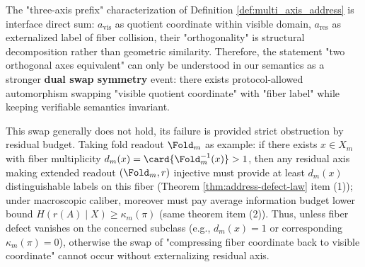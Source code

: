 \begin{remark}\label{rem:xi-dual-swap-symmetry-defect}
The "three-axis prefix" characterization of Definition \ref{def:multi_axis_address} is interface direct sum: \(a_{\mathrm{vis}}\) as quotient coordinate within visible domain, \(a_{\mathrm{res}}\) as externalized label of fiber collision, their "orthogonality" is structural decomposition rather than geometric similarity.
Therefore, the statement "two orthogonal axes equivalent" can only be understood in our semantics as a stronger \textbf{dual swap symmetry} event: there exists protocol-allowed automorphism swapping "visible quotient coordinate" with "fiber label" while keeping verifiable semantics invariant.
\par
This swap generally does not hold, its failure is provided strict obstruction by residual budget.
Taking fold readout \(\Fold_m\) as example: if there exists \(x\in X_m\) with fiber multiplicity \(d_m(x)=\card{\Fold_m^{-1}(x)}>1\), then any residual axis making extended readout \((\Fold_m,r)\) injective must provide at least \(d_m(x)\) distinguishable labels on this fiber (Theorem \ref{thm:address-defect-law} item (1)); under macroscopic caliber, moreover must pay average information budget lower bound \(H(r(A)\mid X)\ge \kappa_m(\pi)\) (same theorem item (2)).
Thus, unless fiber defect vanishes on the concerned subclass (e.g., \(d_m(x)=1\) or corresponding \(\kappa_m(\pi)=0\)), otherwise the swap of "compressing fiber coordinate back to visible coordinate" cannot occur without externalizing residual axis.
\end{remark}

\endinput
